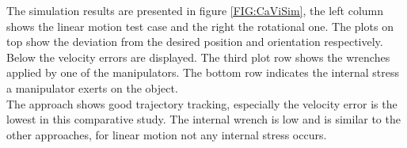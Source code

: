 \documentclass[a4paper,twoside, openright,12pt]{report}
\begin{document}

The simulation results are presented in figure \ref{FIG:CaViSim}, the left column shows the linear motion test case and the right the rotational one. The plots on top show the deviation from the desired position and orientation respectively. Below the velocity errors are displayed. The third plot row shows the wrenches applied by one of the manipulators. The bottom row indicates the internal stress a manipulator exerts on the object.\\
The approach shows good trajectory tracking, especially the velocity error is the lowest in this comparative study. The internal wrench is low and is similar to the other approaches, for linear motion not any internal stress occurs.
\end{document}
